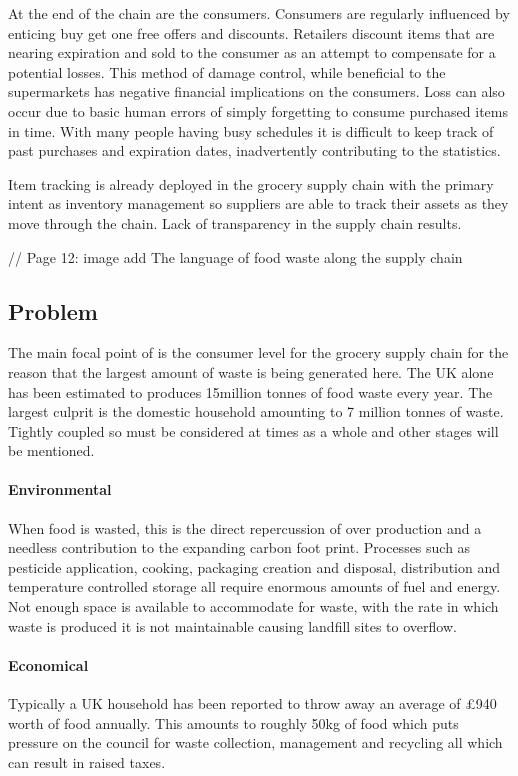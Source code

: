 \documentclass[a4paper, 11pt]{article}
\begin{document}
At the end of the chain are the consumers. Consumers are regularly influenced by enticing buy get one free offers and discounts. Retailers discount items that are nearing expiration and sold to the consumer as an attempt to compensate for a potential losses. This method of damage control, while beneficial to the supermarkets has negative financial implications on the consumers. Loss can also occur due to basic human errors of simply forgetting to consume purchased items in time. With many people having busy schedules it is difficult to keep track of past purchases and expiration dates, inadvertently contributing to the statistics.

Item tracking is already deployed in the grocery supply chain with the primary intent as inventory management so suppliers are able to track their assets as they move through the chain. Lack of transparency in the supply chain results.
\vspace{\baselineskip}

// Page 12: image add The language of food waste along the supply chain 


\subsection{Problem}
The main focal point of is the consumer level for the grocery supply chain for the reason that the largest amount of waste is being generated here. The UK alone has been estimated to produces 15million tonnes of food waste every year. The largest culprit is the domestic household amounting to 7 million tonnes of waste. Tightly coupled so must be considered at times as a whole and other stages will be mentioned.

\paragraph{Environmental} When food is wasted, this is the direct repercussion of over production and a needless contribution to the expanding carbon foot print. Processes such as pesticide application, cooking, packaging creation and disposal, distribution and temperature controlled storage all require enormous amounts of fuel and energy. Not enough space is available to accommodate for waste, with the rate in which waste is produced it is not maintainable causing landfill sites to overflow.

\paragraph{Economical} Typically a UK household has been reported to throw away an average of \pounds940 worth of food annually. This amounts to roughly 50kg of food which puts pressure on the council for waste collection, management and recycling all which can result in raised taxes. 
\end{document}
